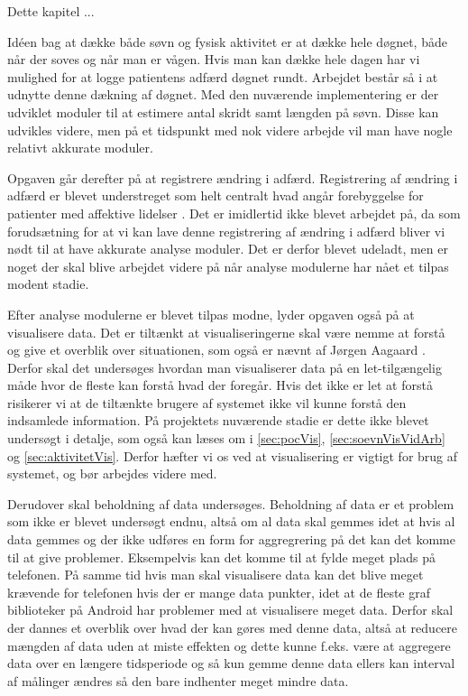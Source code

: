 Dette kapitel ...

Idéen bag at dække både søvn og fysisk aktivitet er at dække hele døgnet, både når der soves og når man er vågen. 
Hvis man kan dække hele dagen har vi mulighed for at logge patientens adfærd døgnet rundt.
Arbejdet består så i at udnytte denne dækning af døgnet.
Med den nuværende implementering er der udviklet moduler til at estimere antal skridt samt længden på søvn.
Disse kan udvikles videre, men på et tidspunkt med nok videre arbejde vil man have nogle relativt akkurate moduler.

Opgaven går derefter på at registrere ændring i adfærd. 
Registrering af ændring i adfærd er blevet understreget som helt centralt hvad angår forebyggelse for patienter med affektive lidelser \citep[Kapitel 1, Sektion 4]{misc:faellesrapp}.
Det er imidlertid ikke blevet arbejdet på, da som forudsætning for at vi kan lave denne registrering af ændring i adfærd bliver vi nødt til at have akkurate analyse moduler.
Det er derfor blevet udeladt, men er noget der skal blive arbejdet videre på når analyse modulerne har nået et tilpas modent stadie.

Efter analyse modulerne er blevet tilpas modne, lyder opgaven også på at visualisere data.
Det er tiltænkt at visualiseringerne skal være nemme at forstå og give et overblik over situationen, som også er nævnt af Jørgen Aagaard \citep[Kapitel 1, Sektion 4]{misc:faellesrapp}. 
Derfor skal det undersøges hvordan man visualiserer data på en let-tilgængelig måde hvor de fleste kan forstå hvad der foregår. 
Hvis det ikke er let at forstå risikerer vi at de tiltænkte brugere af systemet ikke vil kunne forstå den indsamlede information.
På projektets nuværende stadie er dette ikke blevet undersøgt i detalje, som også kan læses om i \cref{sec:pocVis}, \cref{sec:soevnVisVidArb} og \cref{sec:aktivitetVis}. 
Derfor hæfter vi os ved at visualisering er vigtigt for brug af systemet, og bør arbejdes videre med.

Derudover skal beholdning af data undersøges.
Beholdning af data er et problem som ikke er blevet undersøgt endnu, altså om al data skal gemmes idet at hvis al data gemmes og der ikke udføres en form for aggregrering på det kan det komme til at give problemer.
Eksempelvis kan det komme til at fylde meget plads på telefonen. På samme tid hvis man skal visualisere data kan det blive meget krævende for telefonen hvis der er mange data punkter, idet at de fleste graf biblioteker på Android har problemer med at visualisere meget data.
Derfor skal der dannes et overblik over hvad der kan gøres med denne data, altså at reducere mængden af data uden at miste effekten og dette kunne f.eks. være at aggregere data over en længere tidsperiode og så kun gemme denne data ellers kan interval af målinger ændres så den bare indhenter meget mindre data.

